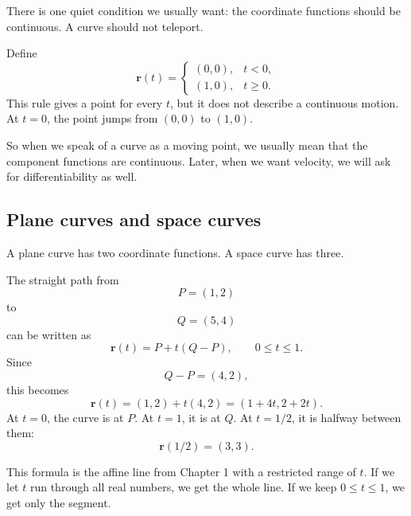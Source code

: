 There is one quiet condition we usually want: the coordinate functions should be
continuous.  A curve should not teleport.

\begin{example}
Define
\[
    \mathbf r(t)=
    \begin{cases}
    (0,0), & t<0,\\
    (1,0), & t\ge 0.
    \end{cases}
\]
This rule gives a point for every \(t\), but it does not describe a continuous motion.
At \(t=0\), the point jumps from \((0,0)\) to \((1,0)\).

So when we speak of a curve as a moving point, we usually mean that the component
functions are continuous.  Later, when we want velocity, we will ask for differentiability
as well.
\end{example}

\subsection{Plane curves and space curves}

A plane curve has two coordinate functions.  A space curve has three.

\begin{example}
The straight path from
\[
    P=(1,2)
\]
to
\[
    Q=(5,4)
\]
can be written as
\[
    \mathbf r(t)=P+t(Q-P),\qquad 0\le t\le1.
\]
Since
\[
    Q-P=(4,2),
\]
this becomes
\[
    \mathbf r(t)=(1,2)+t(4,2)=(1+4t,2+2t).
\]
At \(t=0\), the curve is at \(P\).  At \(t=1\), it is at \(Q\).  At \(t=1/2\), it is halfway
between them:
\[
    \mathbf r(1/2)=(3,3).
\]
\end{example}

This formula is the affine line from Chapter 1 with a restricted range of \(t\).  If we let
\(t\) run through all real numbers, we get the whole line.  If we keep \(0\le t\le1\),
we get only the segment.

